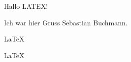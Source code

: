 \documentclass{article}
\begin{document}
Hallo LATEX!  

Ich war hier Gruss Sebastian Buchmann.

\LaTeX 

\huge
\LaTeX 
   
\end{document}
